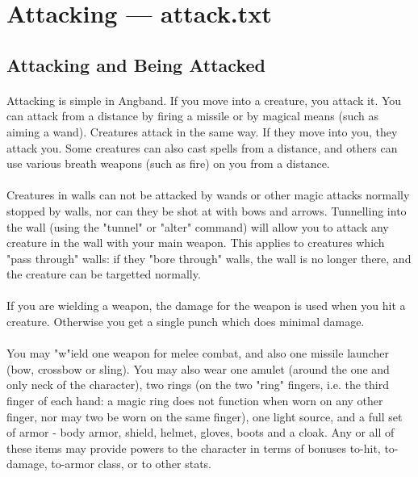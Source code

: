 \section{Attacking --- attack.txt}

\subsection{Attacking and Being Attacked}
\paragraph{}
Attacking is simple in Angband. If you move into a creature, you attack it.
You can attack from a distance by firing a missile or by magical means (such
as aiming a wand). Creatures attack in the same way. If they move into you,
they attack you. Some creatures can also cast spells from a distance, and
others can use various breath weapons (such as fire) on you from a distance.

\paragraph{}
Creatures in walls can not be attacked by wands or other magic attacks
normally stopped by walls, nor can they be shot at with bows and arrows.
Tunnelling into the wall (using the "tunnel" or "alter" command) will
allow you to attack any creature in the wall with your main weapon.
This applies to creatures which "pass through" walls: if they "bore
through" walls, the wall is no longer there, and the creature can be
targetted normally.

\paragraph{}
If you are wielding a weapon, the damage for the weapon is used when you hit
a creature. Otherwise you get a single punch which does minimal damage.

\paragraph{}
You may "w"ield one weapon for melee combat, and also one missile launcher
(bow, crossbow or sling). You may also wear one amulet (around the one and
only neck of the character), two rings (on the two "ring" fingers, i.e. the
third finger of each hand: a magic ring does not function when worn on any
other finger, nor may two be worn on the same finger), one light source,
and a full set of armor - body armor, shield, helmet, gloves, boots and
a cloak. Any or all of these items may provide powers to the character
in terms of bonuses to-hit, to-damage, to-armor class, or to other stats.

